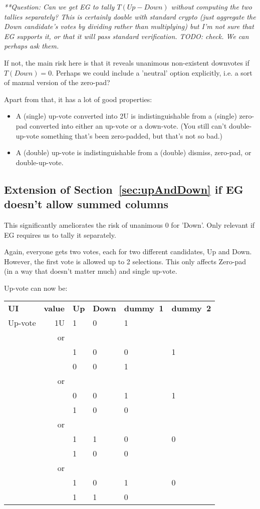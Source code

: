\documentclass[10pt,a4paper]{article}
\begin{document}
\textit{**Question: Can we get EG to tally $T(\textit{Up} - \textit{Down})$ without computing the two tallies separately? This is certainly doable with standard crypto (just aggregate the Down candidate's votes by dividing rather than multiplying) but I'm not sure that EG supports it, or that it will pass standard verification. TODO: check.  We can perhaps ask them.}

If not, the main risk here is that it reveals unanimous non-existent downvotes if $T(\textit{Down}) = 0$. Perhaps we could include a 'neutral' option explicitly, i.e. a sort of manual version of the zero-pad?

Apart from that, it has a lot of good properties:
\begin{itemize}
	\item A (single) up-vote converted into 2U is indistinguishable from a (single) zero-pad converted into either an up-vote or a down-vote. (You still can't double-up-vote something that's been zero-padded, but that's not so bad.)
	\item A (double) up-vote is indistinguishable from a (double) dismiss, zero-pad, or double-up-vote.
\end{itemize}

\subsection{Extension of Section~\ref{sec:upAndDown} if EG doesn't allow summed columns}
This significantly ameliorates the risk of unanimous 0 for 'Down'. Only relevant if EG requires us to tally it separately.

Again, everyone gets two votes, each for two different candidates, Up and Down. However, the first vote is allowed up to 2 selections. This only affects Zero-pad (in a way that doesn't matter much) and single up-vote.

Up-vote can now be:

\begin{tabular}{lrllll}
	{\bf UI}  & {\bf value }&{\bf  Up}&{\bf  Down} &{\bf  dummy~1 } &{\bf  dummy~2 }\\
	
	Up-vote   & 1U          & 1          & 0   & 1 \\
	& or  & & & \\
	&            & 1          & 0  & 0 & 1 \\
	&            & 0          & 0 & 1  &   \\   
	& or  & & & \\
	&            & 0          & 0 & 1  & 1  \\  
	&            & 1          & 0  & 0 &  \\ 
		& or  & & & \\
	&            & 1          & 1 & 0  & 0  \\  
	&            & 1          & 0  & 0 &  \\
		& or  & & & \\
	&            & 1          & 0 & 1  & 0  \\  
	&            & 1          & 1  & 0 &  \\
\end{tabular}
\end{document}
